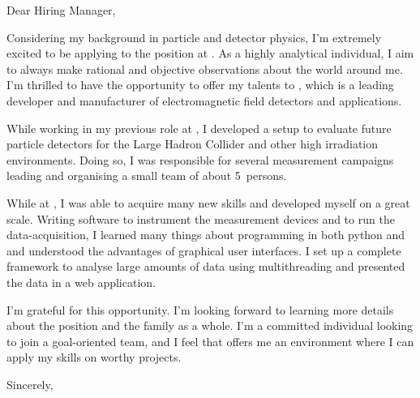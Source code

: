\documentclass[14pt]{extarticle}
\author{Michael Reichmann}
\date{\today}
\begin{document}
%
\maketitle %
%
Dear Hiring Manager,\par
%
Considering my background in particle and detector physics, I'm extremely excited to be applying to the \@position position at \@company.
As a highly analytical individual, I aim to always make rational and objective observations about the world around me.
I'm thrilled to have the opportunity to offer my talents to \@company, which is a leading developer and manufacturer of electromagnetic field detectors and applications.\par
%
While working in my previous role at \@oldcomp, I developed a setup to evaluate future particle detectors for the Large Hadron Collider and other high irradiation environments.
Doing so, I was responsible for several measurement campaigns leading and organising a small team of about \SI{5}{persons}.\par
%
While at \@oldcomp, I was able to acquire many new skills and developed myself on a great scale.
Writing software to instrument the measurement devices and to run the data-acquisition, I learned many things about programming in both python and \cpp and understood the advantages of graphical user interfaces.
I set up a complete framework to analyse large amounts of data using multithreading and presented the data in a web application.\par
%
I'm grateful for this opportunity.
I'm looking forward to learning more details about the \@position position and the \@company family as a whole.
I'm a committed individual looking to join a goal-oriented team, and I feel that \@company offers me an environment where I can apply my skills on worthy projects.\par
%
Sincerely,\par
%
\@author
%
\end{document}
